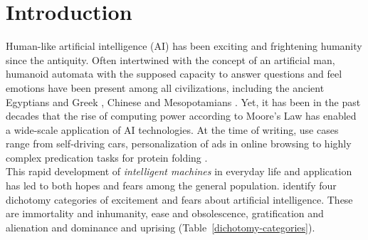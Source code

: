 \section{Introduction}

Human-like artificial intelligence (AI) has been exciting and frightening humanity since the antiquity.
Often intertwined with the concept of an artificial man, humanoid automata with the supposed capacity to answer questions and feel emotions have been present among all civilizations, including the ancient Egyptians and Greek \citep{Newquist1994}, Chinese \citep{cohen1986} and Mesopotamians \citep{unat2008}.
Yet, it has been in the past decades that the rise of computing power according to Moore’s Law has enabled a wide-scale application of AI technologies.
At the time of writing, use cases range from self-driving cars, personalization of ads in online browsing to highly complex predication tasks for protein folding \citep{jumper2021}.
\\
This rapid development of \emph{intelligent machines} in everyday life and application has led to both hopes and fears among the general population.
\citet{cave2019} identify four dichotomy categories of excitement and fears about artificial intelligence.
These are immortality and inhumanity, ease and obsolescence, gratification and alienation and dominance and uprising (Table~\ref{dichotomy-categories}).


